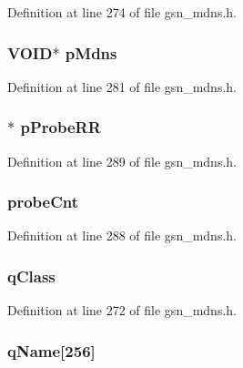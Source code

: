Definition at line 274 of file gsn\_\-mdns.h.

\hypertarget{a00455_a78ed200b6ab62a58bf95dbdcaad70ad9}{
\subsubsection[{pMdns}]{\setlength{\rightskip}{0pt plus 5cm}VOID$\ast$ {\bf pMdns}}}
\label{a00455_a78ed200b6ab62a58bf95dbdcaad70ad9}


Definition at line 281 of file gsn\_\-mdns.h.

\hypertarget{a00455_a3607aae80ea78e020d44ffb6610db690}{
\subsubsection[{pProbeRR}]{$\ast$ {\bf pProbeRR}}}
\label{a00455_a3607aae80ea78e020d44ffb6610db690}


Definition at line 289 of file gsn\_\-mdns.h.

\hypertarget{a00455_a166af3a50a8a06204bd41361f3b54dcc}{
\subsubsection[{probeCnt}]{ {\bf probeCnt}}}
\label{a00455_a166af3a50a8a06204bd41361f3b54dcc}


Definition at line 288 of file gsn\_\-mdns.h.

\hypertarget{a00455_afa93f8c57cd3599611c2bdd66fe4433b}{
\subsubsection[{qClass}]{ {\bf qClass}}}
\label{a00455_afa93f8c57cd3599611c2bdd66fe4433b}


Definition at line 272 of file gsn\_\-mdns.h.

\hypertarget{a00455_aa27c08470cf3f9fcc816576da0f6e5f8}{
\subsubsection[{qName}]{ {\bf qName}\mbox{[}256\mbox{]}}}
\label{a00455_aa27c08470cf3f9fcc816576da0f6e5f8}


